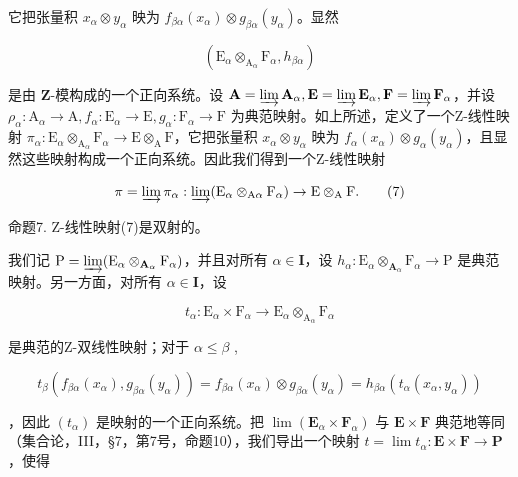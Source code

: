 它把张量积 \(x_{\alpha} \otimes y_{\alpha}\) 映为 \(f_{\beta\alpha}(x_{\alpha}) \otimes g_{\beta\alpha}(y_{\alpha})\)。显然

\[
\left(\mathrm{E} _ {\alpha} \otimes_ {\mathrm{A} _ {\alpha}} \mathrm{F} _ {\alpha}, h _ {\beta \alpha}\right)
\]

是由 \(\mathbf{Z}\)-模构成的一个正向系统。设 \(\mathbf{A} = \varinjlim \mathbf{A}_{\alpha}, \mathbf{E} = \varinjlim \mathbf{E}_{\alpha}, \mathbf{F} = \varinjlim \mathbf{F}_{\alpha}\)，并设 \(\rho_{\alpha}: \mathrm{A}_{\alpha} \to \mathrm{A}, f_{\alpha}: \mathrm{E}_{\alpha} \to \mathrm{E}, g_{\alpha}: \mathrm{F}_{\alpha} \to \mathrm{F}\) 为典范映射。如上所述，定义了一个Z-线性映射 \(\pi_{\alpha}: \mathrm{E}_{\alpha} \otimes_{\mathrm{A}_{\alpha}} \mathrm{F}_{\alpha} \to \mathrm{E} \otimes_{\mathrm{A}} \mathrm{F}\)，它把张量积 \(x_{\alpha} \otimes y_{\alpha}\) 映为 \(f_{\alpha}(x_{\alpha}) \otimes g_{\alpha}(y_{\alpha})\)，且显然这些映射构成一个正向系统。因此我们得到一个Z-线性映射

\[
\pi = \varinjlim \pi_ {\alpha}: \varinjlim (\mathrm{E} _ {\alpha} \otimes_ {\mathrm{A} \alpha} \mathrm{F} _ {\alpha}) \rightarrow \mathrm{E} \otimes_ {\mathrm{A}} \mathrm{F}.\tag{7}
\]

命题7. Z-线性映射(7)是双射的。

我们记 \(\mathrm{P} = \varinjlim (\mathrm{E}_{\alpha}\otimes_{\mathbf{A}_{\alpha}}\mathrm{F}_{\alpha})\)，并且对所有 \(\alpha \in \mathbf{I}\)，设 \(h_\alpha : \mathrm{E}_\alpha \otimes_{\mathbf{A}_\alpha}\mathrm{F}_\alpha \to \mathrm{P}\) 是典范映射。另一方面，对所有 \(\alpha \in \mathbf{I}\)，设

\[
t _ {\alpha}: \mathrm{E} _ {\alpha} \times \mathrm{F} _ {\alpha} \rightarrow \mathrm{E} _ {\alpha} \otimes_ {\mathrm{A} _ {\alpha}} \mathrm{F} _ {\alpha}
\]

是典范的Z-双线性映射；对于 \(\alpha \leqslant \beta\) ,

\[
t _ {\beta} \left(f _ {\beta \alpha} \left(x _ {\alpha}\right), g _ {\beta \alpha} \left(y _ {\alpha}\right)\right) = f _ {\beta \alpha} \left(x _ {\alpha}\right) \otimes g _ {\beta \alpha} \left(y _ {\alpha}\right) = h _ {\beta \alpha} \left(t _ {\alpha} \left(x _ {\alpha}, y _ {\alpha}\right)\right)
\]

，因此 \((t_{\alpha})\) 是映射的一个正向系统。把 \(\lim (\mathbf{E}_{\alpha}\times \mathbf{F}_{\alpha})\) 与 \(\mathbf{E}\times \mathbf{F}\) 典范地等同（集合论，III，§7，第7号，命题10），我们导出一个映射 \(t = \lim t_{\alpha}:\mathbf{E}\times \mathbf{F}\to \mathbf{P}\)，使得

